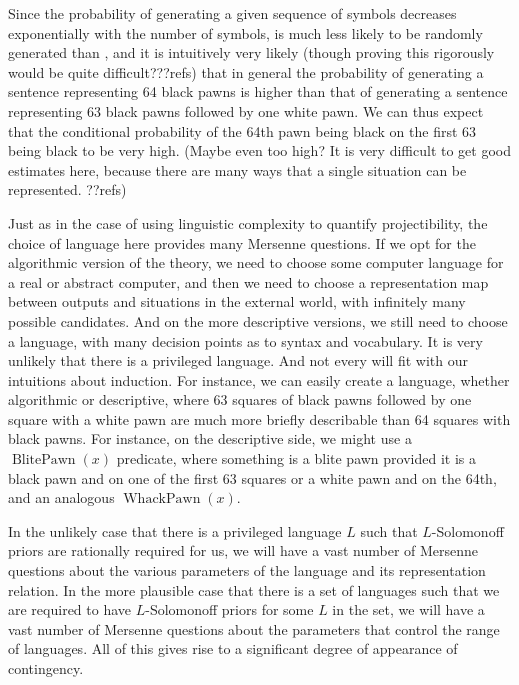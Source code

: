 Since the probability of generating a given sequence of symbols decreases exponentially with the number of symbols, 
is much less likely to be randomly generated than , and it is intuitively very likely (though proving this rigorously would
be quite difficult???refs) that in general the probability of generating a sentence representing 64 black pawns is higher than that of 
generating a sentence representing 63 black pawns followed by one white pawn. We can thus expect that the conditional probability of
the 64th pawn being black on the first 63 being black to be very high. (Maybe even too high? It is very difficult to get good
estimates here, because there are many ways that a single situation can be represented. ??refs)

Just as in the case of using linguistic complexity to quantify projectibility, the choice of language here provides many Mersenne
questions. If we opt for the algorithmic version of the theory, we need to choose some computer language for a real or abstract
computer, and then we need to choose a representation map between outputs and situations in the external world, with infinitely
many possible candidates. And on the more
descriptive versions, we still need to choose a language, with many decision points as to syntax and vocabulary. It is very unlikely 
that there is a privileged language. And not
every will fit with our intuitions about induction. For instance, we can easily create a language, whether algorithmic or descriptive,
where 63 squares of black pawns followed by one square with a white pawn are much more briefly describable than 64 squares with
black pawns. For instance, on the descriptive side, we might use a $\operatorname{BlitePawn}(x)$ predicate, where something is a blite pawn 
provided it is a black pawn and on one of the first 63 squares or a white pawn and on the 64th, and an analogous $\operatorname{WhackPawn}(x)$.

In the unlikely case that there is a privileged language $L$ such that $L$-Solomonoff priors are rationally required for us,
we will have a vast number of Mersenne questions about the various parameters of the language and its representation relation.
In the more plausible case that there is a set of languages such that we are required to have $L$-Solomonoff priors for some $L$
in the set, we will have a vast number of Mersenne questions about the parameters that control the range of languages. All of this
gives rise to a significant degree of appearance of contingency.

